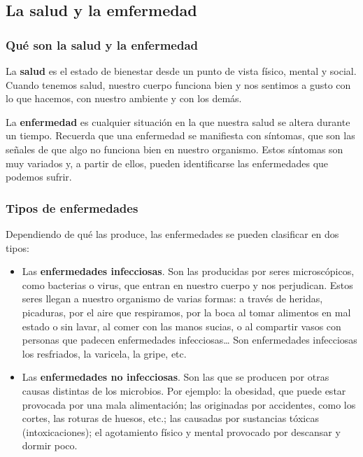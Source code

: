 \subsection{La salud y la emfermedad}

\subsubsection{Qué son la salud y la enfermedad}

La \textbf{salud} es el estado de bienestar desde un punto de vista físico, mental y social. Cuando tenemos salud, nuestro cuerpo funciona bien y nos sentimos a gusto con lo que hacemos, con nuestro ambiente y con los demás.

\vspace{3mm}
La \textbf{enfermedad} es cualquier situación en la que nuestra salud se altera durante un tiempo. Recuerda que una enfermedad se manifiesta con síntomas, que son las señales de que algo no funciona bien en nuestro organismo. Estos síntomas son muy variados y, a partir de ellos, pueden identificarse las enfermedades que podemos sufrir.

\subsubsection{Tipos de enfermedades}

Dependiendo de qué las produce, las enfermedades se pueden clasificar en dos tipos:

\begin{itemize}
    \item Las \textbf{enfermedades infecciosas}. Son las producidas por seres microscópicos, como bacterias o virus, que entran en nuestro cuerpo y nos perjudican. Estos seres llegan a nuestro organismo de varias formas: a través de heridas, picaduras, por el aire que respiramos, por la boca al tomar alimentos en mal estado o sin lavar, al comer con las manos sucias, o al compartir vasos con personas que padecen enfermedades infecciosas… Son enfermedades infecciosas los resfriados, la varicela, la gripe, etc.
    \item Las \textbf{enfermedades no infecciosas}. Son las que se producen por otras causas distintas de los microbios. Por ejemplo: la obesidad, que puede estar provocada por una mala alimentación; las originadas por accidentes, como los cortes, las roturas de huesos, etc.; las causadas por sustancias tóxicas (intoxicaciones); el agotamiento físico y mental provocado por descansar y dormir poco.
\end{itemize}

